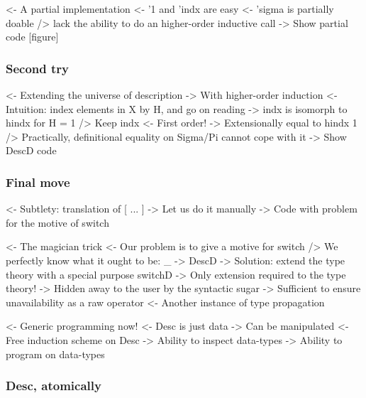 \documentclass{article}
\newenvironment{structure}{\footnotesize\verbatim}{\endverbatim}
\begin{document}
\begin{structure}
<- A partial implementation
    <- '1 and 'indx are easy
    <- 'sigma is partially doable
        /> lack the ability to do an higher-order inductive call
    -> Show partial code [figure]
\end{structure}

\subsubsection{Second try}

\begin{structure}
<- Extending the universe of description
    -> With higher-order induction
    <- Intuition: index elements in X by H, and go on reading
        -> indx is isomorph to hindx for H = 1
    /> Keep indx
        <- First order!
        -> Extensionally equal to hindx 1
        /> Practically, definitional equality on Sigma/Pi cannot cope with it
    -> Show DescD code
\end{structure}

\subsubsection{Final move}

\begin{structure}
<- Subtlety: translation of [ ... ]
    -> Let us do it manually
        -> Code with problem for the motive of switch
\end{structure}

\begin{structure}
<- The magician trick
    <- Our problem is to give a motive for switch
        /> We perfectly know what it ought to be: \_ -> DescD
    -> Solution: extend the type theory with a special purpose switchD
        -> Only extension required to the type theory!
        -> Hidden away to the user by the syntactic sugar
            -> Sufficient to ensure unavailability as a raw operator
            <- Another instance of type propagation
\end{structure}

\begin{structure}
<- Generic programming now!
    <- Desc is just data
        -> Can be manipulated
    <- Free induction scheme on Desc
        -> Ability to inspect data-types
        -> Ability to program on data-types
\end{structure}

\subsubsection{Desc, atomically}
\end{document}
